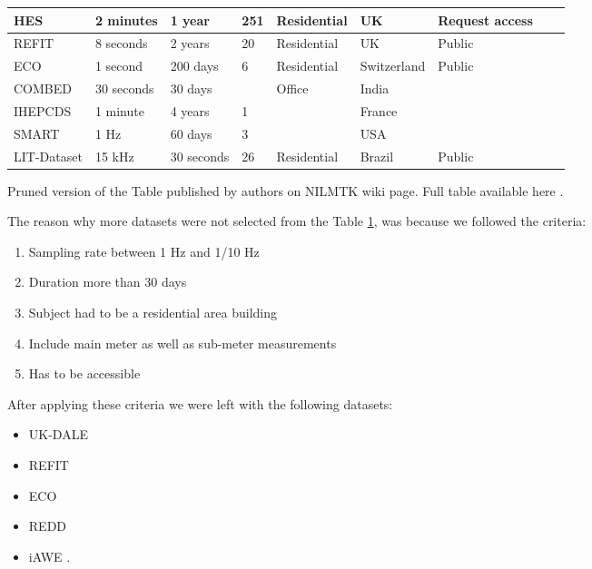 \begin{table}[H]
{\begin{tabular}{|l|l|l|l|l|l|l|l|l|}
        HES & 2 minutes & 1 year & 251 & Residential & UK & Request access \\ \hline
        REFIT & 8 seconds & 2 years & 20 & Residential & UK & Public \\ \hline
        ECO & 1 second & 200 days & 6 & Residential & Switzerland & Public \\ \hline
        COMBED & 30 seconds & 30 days & ~ & Office & India & ~ \\ \hline
        IHEPCDS & 1 minute & 4 years & 1 & ~ & France & ~ \\ \hline
        SMART & 1 Hz & 60 days & 3 & ~ & USA & ~ \\ \hline
        LIT-Dataset & 15 kHz & 30 seconds & 26 & Residential & Brazil & Public \\ \hline
    \end{tabular}}
    \par 
    \par\footnotesize{Pruned version of the Table published by authors on NILMTK wiki page. Full table available here .}
    \label{tab:other_datasets}
\end{table}



The reason why more datasets were not selected from the Table \ref{tab:other_datasets},
was because we followed the criteria:
\begin{enumerate}
    \item Sampling rate between 1 Hz and 1/10 Hz
    \item Duration more than 30 days
    \item Subject had to be a residential area building
    \item Include main meter as well as sub-meter measurements
    \item Has to be accessible
\end{enumerate}

After applying these criteria we were left with the following datasets:

\begin{itemize}
    \item UK-DALE \cite{UKDALE}
    \item REFIT \cite{REFIT}
    \item ECO \cite{ECO}
    \item REDD \cite{REDD}
    \item iAWE \cite{iAWE}.
\end{itemize}

